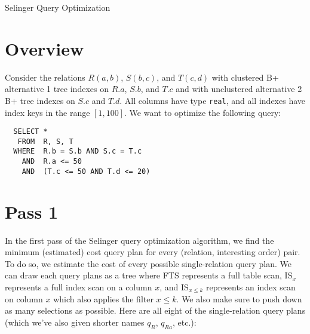 \documentclass{article}
\begin{document}
\begin{center}
  \huge Selinger Query Optimization
\end{center}

\section*{Overview}
Consider the relations $R(a, b)$, $S(b, c)$, and $T(c, d)$ with clustered B+
alternative 1 tree indexes on $R.a$, $S.b$, and $T.c$ and with unclustered
alternative 2 B+ tree indexes on $S.c$ and $T.d$. All columns have type
\texttt{real}, and all indexes have index keys in the range $[1, 100]$. We want
to optimize the following query:
\begin{verbatim}
  SELECT *
   FROM  R, S, T
  WHERE  R.b = S.b AND S.c = T.c
    AND  R.a <= 50
    AND  (T.c <= 50 AND T.d <= 20)
\end{verbatim}

\section*{Pass 1}
\newcommand{\fts}{FTS}
\newcommand{\is}[1]{IS$_{#1}$}
\newcommand{\select}[1]{$\sigma_{#1}$}

In the first pass of the Selinger query optimization algorithm, we find the
minimum (estimated) cost query plan for every (relation, interesting order)
pair. To do so, we estimate the cost of every possible single-relation query
plan. We can draw each query plans as a tree where \fts{} represents a full
table scan, \is{x} represents a full index scan on a column $x$, and \is{x \leq
k} represents an index scan on column $x$ which also applies the filter $x \leq
k$. We also make sure to push down as many selections as possible. Here are all
eight of the single-relation query plans (which we've also given shorter names
$q_R$, $q_{Ra}$, etc.):

\newcommand{\plan}[1]{\tikz[yscale=0.5]{#1}}

\newcommand{\rfts}{\plan{
  \node{\select{R.a \leq 50}} child {node{\fts} child {node {$R$}}};
}}
\newcommand{\risa}{\plan{ \node{\is{a \leq 50}} child {node{$R$}}; }}
\newcommand{\sfts}{\plan{ \node{\fts} child {node{$S$}}; }}
\newcommand{\sisb}{\plan{ \node{\is{b}} child {node{$S$}}; }}
\newcommand{\sisc}{\plan{ \node{\is{c}} child {node{$S$}}; }}
\newcommand{\tfts}{\plan{
  \node{\select{T.d \leq 20}}
    child { node{\select{T.c \leq 50}}
      child {node{\fts} child {node {$R$}}}
    };
}}
\newcommand{\tisc}{\plan{
  \node{\select{R.d \leq 20}} child {node{\is{c \leq 50}} child {node {$R$}}};
}}
\newcommand{\tisd}{\plan{
  \node{\select{R.c \leq 50}} child {node{\is{d \leq 20}} child {node {$R$}}};
}}
\end{document}
